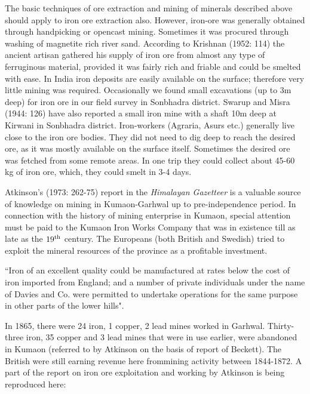 The basic techniques of ore extraction and mining of minerals described above should apply to iron ore extraction also. However, iron-ore was generally obtained through handpicking or opencast mining. Sometimes it was procured through washing of magnetite rich river sand. According to Krishnan (1952: 114) the ancient artisan gathered his supply of iron ore from almost any type of ferruginous material, provided it was fairly rich and friable and could be smelted with ease. In India iron deposits are easily available on the surface; therefore very little mining was required. Occasionally we found small excavations (up to 3m deep) for iron ore in our field survey in Sonbhadra district. Swarup and Misra (1944: 126) have also reported a small iron mine with a shaft 10m deep at Kirwani in Sonbhadra district. Iron-workers (Agraria, Asurs etc.) generally live close to the iron ore bodies. They did not need to dig deep to reach the desired ore, as it was mostly available on the surface itself. Sometimes the desired ore was fetched from some remote areas. In one trip they could collect about 45-60 kg of iron ore, which, they could smelt in 3-4 days.

Atkinson's (1973: 262-75) report in the {\it Himalayan Gazetteer} is a valuable source of knowledge on mining in Kumaon-Garhwal up to pre-independence period. In connection with the history of mining enterprise in Kumaon, special attention must be paid to the Kumaon Iron Works Company that was in existence till as late as the $19^{\rm th}$ century. The Europeans (both British and Swedish) tried to exploit the mineral resources of the province as a profitable investment.

 ``Iron of an excellent quality could be manufactured at rates below the cost of iron imported from England; and a number of private individuals under the name of Davies and Co. were permitted to undertake operations for the same purpose in other parts of the lower hills". 

In 1865, there were 24 iron, 1 copper, 2 lead mines worked in Garhwal. Thirty-three iron, 35 copper and 3 lead mines that were in use earlier, were abandoned in Kumaon (referred to by Atkinson on the basis of report of Beckett). The British were still earning revenue here from\newpage mining activity between 1844-1872. A part of the report on iron ore exploitation and working by Atkinson is being reproduced here:

